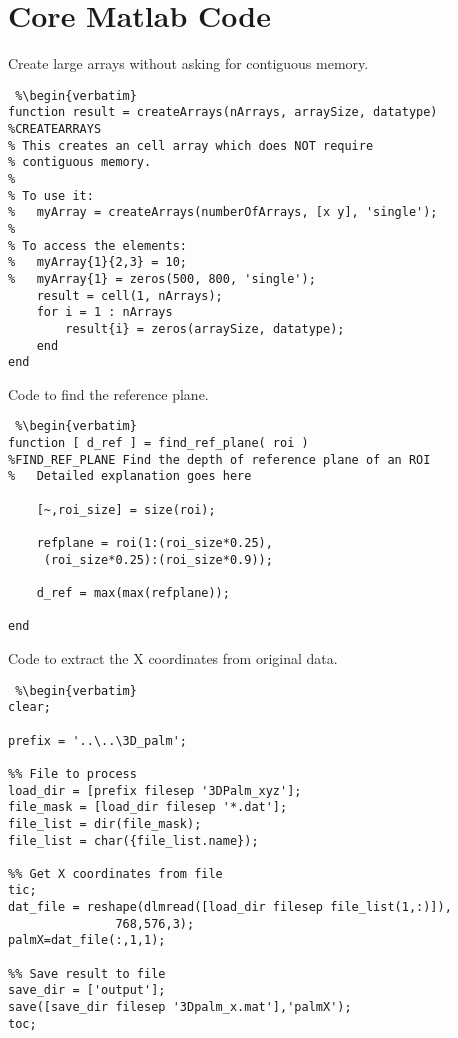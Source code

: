 \chapter{Core Matlab Code\label{ch:code}}



\singlespacing

Create large arrays without asking for contiguous memory.

\begin{lstlisting} %\begin{verbatim}
function result = createArrays(nArrays, arraySize, datatype)
%CREATEARRAYS
% This creates an cell array which does NOT require
% contiguous memory.
%
% To use it:
%   myArray = createArrays(numberOfArrays, [x y], 'single');
%
% To access the elements:
%   myArray{1}{2,3} = 10;
%   myArray{1} = zeros(500, 800, 'single');
    result = cell(1, nArrays);
    for i = 1 : nArrays
        result{i} = zeros(arraySize, datatype);
    end
end
\end{lstlisting} %
\clearpage

Code to find the reference plane.

\begin{lstlisting} %\begin{verbatim}
function [ d_ref ] = find_ref_plane( roi )
%FIND_REF_PLANE Find the depth of reference plane of an ROI
%   Detailed explanation goes here

    [~,roi_size] = size(roi);

    refplane = roi(1:(roi_size*0.25),
     (roi_size*0.25):(roi_size*0.9));

    d_ref = max(max(refplane));

end
\end{lstlisting} %
\clearpage

Code to extract the X coordinates from original data.
\begin{lstlisting} %\begin{verbatim}
clear;

prefix = '..\..\3D_palm';

%% File to process
load_dir = [prefix filesep '3DPalm_xyz'];
file_mask = [load_dir filesep '*.dat'];
file_list = dir(file_mask);
file_list = char({file_list.name});

%% Get X coordinates from file
tic;
dat_file = reshape(dlmread([load_dir filesep file_list(1,:)]),
               768,576,3);
palmX=dat_file(:,1,1);

%% Save result to file
save_dir = ['output'];
save([save_dir filesep '3Dpalm_x.mat'],'palmX');
toc;
\end{lstlisting} %
\clearpage

